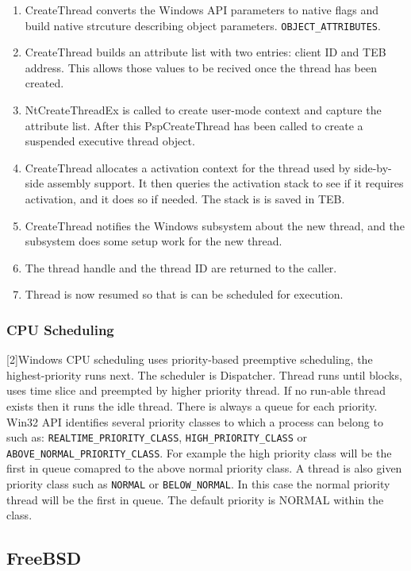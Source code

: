 \documentclass[letterpaper,10pt,draftclsnofoot,onecolumn]{IEEEtran}
\begin{document}
\begin{enumerate}
\item CreateThread converts the Windows API parameters to native flags and build native strcuture describing object parameters. \verb|OBJECT_ATTRIBUTES|.
\item CreateThread builds an attribute list with two entries: client ID and TEB address. This allows those values to be recived once the thread has been created.
\item NtCreateThreadEx is called to create user-mode context and capture the attribute list. After this PspCreateThread has been called to create a suspended executive thread object.
\item CreateThread allocates a activation context for the thread used by side-by-side assembly support. It then queries the activation stack to see if it requires activation, and it does so if needed. The stack is is saved in TEB.
\item CreateThread notifies the Windows subsystem about the new thread, and the subsystem does some setup work for the new thread.
\item The thread handle and the thread ID are returned to the caller.
\item Thread is now resumed so that is can be scheduled for execution. 
\end{enumerate}

\subsubsection*{CPU Scheduling}

[2]Windows CPU scheduling uses priority-based preemptive scheduling, the highest-priority runs next. The scheduler is Dispatcher. Thread runs until blocks, uses time slice and preempted by higher priority thread. If no run-able thread exists then it runs the idle thread. There is always a queue for each priority. Win32 API identifies several priority classes to which a process can belong to such as: \verb|REALTIME_PRIORITY_CLASS|, \verb|HIGH_PRIORITY_CLASS| or \verb|ABOVE_NORMAL_PRIORITY_CLASS|. For example the high priority class will be the first in queue comapred to the above normal priority class. A thread is also given priority class such as \verb|NORMAL| or \verb|BELOW_NORMAL|. In this case the normal priority thread will be the first in queue. The default priority is NORMAL within the class.

\subsection*{FreeBSD}
\end{document}
